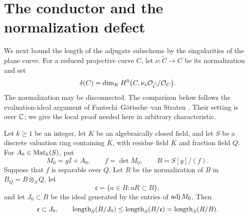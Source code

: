 \section{The conductor and the normalization defect}
\label{sec:conductor}

We next bound the length of the adjugate subscheme by the singularities
of the plane curve.  For a reduced projective curve \(C\), let
\(\nu:\widetilde C\to C\) be its normalization and set
\begin{equation}
 \delta(C)=
 \dim_K H^0\bigl(C,\nu_*\mathcal O_{\widetilde C}/\mathcal O_C\bigr).
 \label{eq:conductor-delta}
\end{equation}
The normalization may be disconnected.  The comparison below follows the
evaluation-ideal argument of Fantechi--G\"ottsche--van Straten
\cite[Proposition C.2 and Corollary C.3]{FGvS1999}.
Their setting is over \(\mathbb C\); we give the local proof needed here in
arbitrary characteristic.

\begin{lemma}
\label{lem:conductor-local}
Let \(k\ge1\) be an integer, let \(K\) be an algebraically closed field,
and let \(S\) be a discrete
valuation ring containing \(K\), with residue field \(K\) and fraction
field \(Q\).  For \(A_0\in\operatorname{Mat}_k(S)\), put
\[
 M_0=yI+A_0,\qquad f=\det M_0,\qquad B=S[y]/(f).
\]
Suppose that \(f\) is separable over \(Q\).  Let \(R\) be the normalization
of \(B\) in \(B_Q=B\otimes_S Q\), let
\[
 \mathfrak c=\{a\in B:aR\subset B\},
\]
and let \(J_0\subset B\) be the ideal generated by the entries of
\(\operatorname{adj} M_0\).  Then
\begin{equation}
 \mathfrak c\subset J_0,\qquad
 \operatorname{length}_S(B/J_0)\le
 \operatorname{length}_S(B/\mathfrak c)=\operatorname{length}_S(R/B).
 \label{eq:conductor-local-length}
\end{equation}
\end{lemma}

